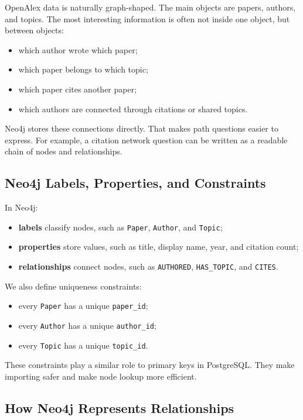 \documentclass[11pt]{article}
\begin{document}
OpenAlex data is naturally graph-shaped.
The main objects are papers, authors, and topics.
The most interesting information is often not inside one object, but between objects:

\begin{itemize}
    \item which author wrote which paper;
    \item which paper belongs to which topic;
    \item which paper cites another paper;
    \item which authors are connected through citations or shared topics.
\end{itemize}

Neo4j stores these connections directly.
That makes path questions easier to express.
For example, a citation network question can be written as a readable chain of nodes and relationships.

\subsection{Neo4j Labels, Properties, and Constraints}

In Neo4j:

\begin{itemize}
    \item \textbf{labels} classify nodes, such as \texttt{Paper}, \texttt{Author}, and \texttt{Topic};
    \item \textbf{properties} store values, such as title, display name, year, and citation count;
    \item \textbf{relationships} connect nodes, such as \texttt{AUTHORED}, \texttt{HAS\_TOPIC}, and \texttt{CITES}.
\end{itemize}

We also define uniqueness constraints:

\begin{itemize}
    \item every \texttt{Paper} has a unique \texttt{paper\_id};
    \item every \texttt{Author} has a unique \texttt{author\_id};
    \item every \texttt{Topic} has a unique \texttt{topic\_id}.
\end{itemize}

These constraints play a similar role to primary keys in PostgreSQL.
They make importing safer and make node lookup more efficient.

\subsection{How Neo4j Represents Relationships}
\end{document}
